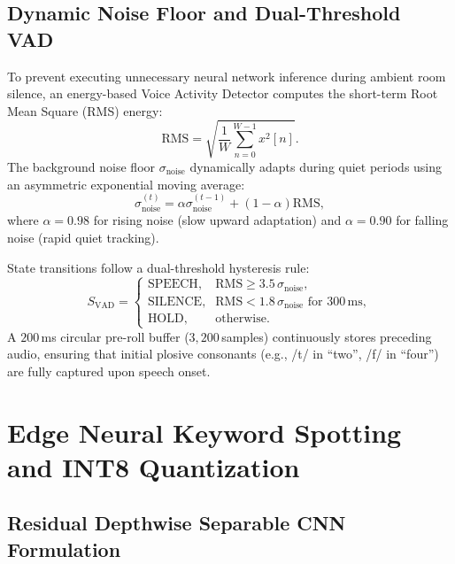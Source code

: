 \documentclass[10pt,twocolumn,letterpaper]{article}
\begin{document}
\subsection{Dynamic Noise Floor and Dual-Threshold VAD}

To prevent executing unnecessary neural network inference during ambient room silence, an energy-based Voice Activity Detector computes the short-term Root Mean Square (RMS) energy:
\begin{equation}
    \text{RMS} = \sqrt{\frac{1}{W} \sum_{n=0}^{W-1} x^2[n]}.
\end{equation}
The background noise floor $\sigma_{\text{noise}}$ dynamically adapts during quiet periods using an asymmetric exponential moving average:
\begin{equation}
    \sigma_{\text{noise}}^{(t)} = \alpha \sigma_{\text{noise}}^{(t-1)} + (1 - \alpha) \text{RMS},
\end{equation}
where $\alpha = 0.98$ for rising noise (slow upward adaptation) and $\alpha = 0.90$ for falling noise (rapid quiet tracking).

State transitions follow a dual-threshold hysteresis rule:
\begin{equation}
    S_{\text{VAD}} = 
    \begin{cases}
        \text{SPEECH}, & \text{RMS} \ge 3.5\,\sigma_{\text{noise}}, \\
        \text{SILENCE}, & \text{RMS} < 1.8\,\sigma_{\text{noise}} \text{ for } 300\,\text{ms}, \\
        \text{HOLD}, & \text{otherwise}.
    \end{cases}
\end{equation}
A $200$\,ms circular pre-roll buffer ($3{,}200$\,samples) continuously stores preceding audio, ensuring that initial plosive consonants (e.g., /t/ in ``two'', /f/ in ``four'') are fully captured upon speech onset.

\section{Edge Neural Keyword Spotting and INT8 Quantization}

\subsection{Residual Depthwise Separable CNN Formulation}
\end{document}
